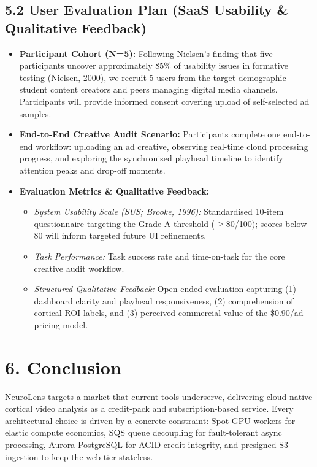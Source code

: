 \documentclass[10pt,a4paper]{article}
\begin{document}
\subsection*{\textsf{5.2 User Evaluation Plan (SaaS Usability \& Qualitative Feedback)}}
\begin{itemize}
    \item \textbf{Participant Cohort (N=5):} Following Nielsen's finding that five participants uncover approximately 85\% of usability issues in formative testing (Nielsen, 2000), we recruit 5 users from the target demographic --- student content creators and peers managing digital media channels. Participants will provide informed consent covering upload of self-selected ad samples.
    \item \textbf{End-to-End Creative Audit Scenario:} Participants complete one end-to-end workflow: uploading an ad creative, observing real-time cloud processing progress, and exploring the synchronised playhead timeline to identify attention peaks and drop-off moments.
    \item \textbf{Evaluation Metrics \& Qualitative Feedback:}
    \begin{itemize}
        \item \textit{System Usability Scale (SUS; Brooke, 1996):} Standardised 10-item questionnaire targeting the Grade A threshold ($\ge$80/100); scores below 80 will inform targeted future UI refinements.
        \item \textit{Task Performance:} Task success rate and time-on-task for the core creative audit workflow.
        \item \textit{Structured Qualitative Feedback:} Open-ended evaluation capturing (1) dashboard clarity and playhead responsiveness, (2) comprehension of cortical ROI labels, and (3) perceived commercial value of the \$0.90/ad pricing model.
    \end{itemize}
\end{itemize}

\section*{\textsf{6. Conclusion}}
NeuroLens targets a market that current tools underserve, delivering cloud-native cortical video analysis as a credit-pack and subscription-based service. Every architectural choice is driven by a concrete constraint: Spot GPU workers for elastic compute economics, SQS queue decoupling for fault-tolerant async processing, Aurora PostgreSQL for ACID credit integrity, and presigned S3 ingestion to keep the web tier stateless.
\end{document}
